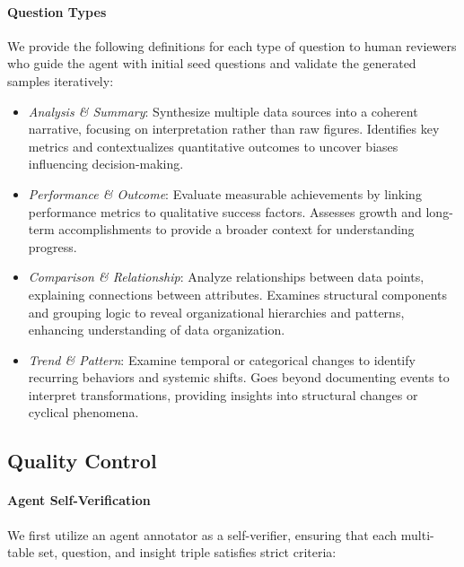 \paragraph{Question Types}
We provide the following definitions for each type of question to human reviewers who guide the agent with initial seed questions and validate the generated samples iteratively:
\begin{itemize}[leftmargin=*,topsep=4pt,itemsep=4pt,parsep=0pt]
    \item \textit{Analysis \& Summary}:
Synthesize multiple data sources into a coherent narrative, focusing on interpretation rather than raw figures. Identifies key metrics and contextualizes quantitative outcomes to uncover biases influencing decision-making.

    \item \textit{Performance \& Outcome}: 
Evaluate measurable achievements by linking performance metrics to qualitative success factors. Assesses growth and long-term accomplishments to provide a broader context for understanding progress.
    
    \item \textit{Comparison \& Relationship}:
Analyze relationships between data points, explaining connections between attributes. Examines structural components and grouping logic to reveal organizational hierarchies and patterns, enhancing understanding of data organization.
    \item \textit{Trend \& Pattern}:
Examine temporal or categorical changes to identify recurring behaviors and systemic shifts. Goes beyond documenting events to interpret transformations, providing insights into structural changes or cyclical phenomena.
\end{itemize}

\subsection{Quality Control}
\label{apx:verify_detail}
\paragraph{Agent Self-Verification}
We first utilize an agent annotator as a self-verifier, ensuring that each multi-table set, question, and insight triple satisfies strict criteria:


